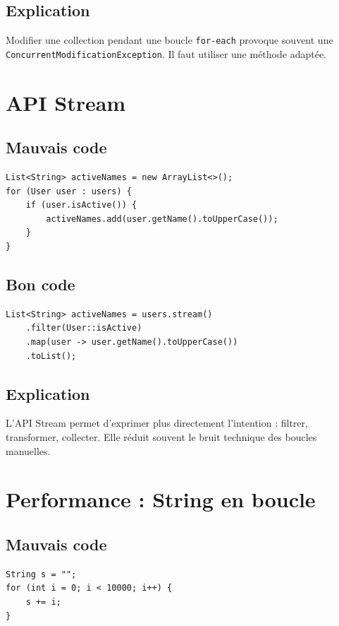 \documentclass[a4paper,11pt]{report}
\begin{document}
\section{Explication}
Modifier une collection pendant une boucle \texttt{for-each} provoque souvent une \texttt{ConcurrentModificationException}.
Il faut utiliser une méthode adaptée.

\chapter{API Stream}

\section{Mauvais code}
\begin{lstlisting}
List<String> activeNames = new ArrayList<>();
for (User user : users) {
    if (user.isActive()) {
        activeNames.add(user.getName().toUpperCase());
    }
}
\end{lstlisting}

\section{Bon code}
\begin{lstlisting}
List<String> activeNames = users.stream()
    .filter(User::isActive)
    .map(user -> user.getName().toUpperCase())
    .toList();
\end{lstlisting}

\section{Explication}
L'API Stream permet d'exprimer plus directement l'intention : filtrer, transformer, collecter.
Elle réduit souvent le bruit technique des boucles manuelles.

\chapter{Performance : String en boucle}

\section{Mauvais code}
\begin{lstlisting}
String s = "";
for (int i = 0; i < 10000; i++) {
    s += i;
}
\end{lstlisting}
\end{document}
